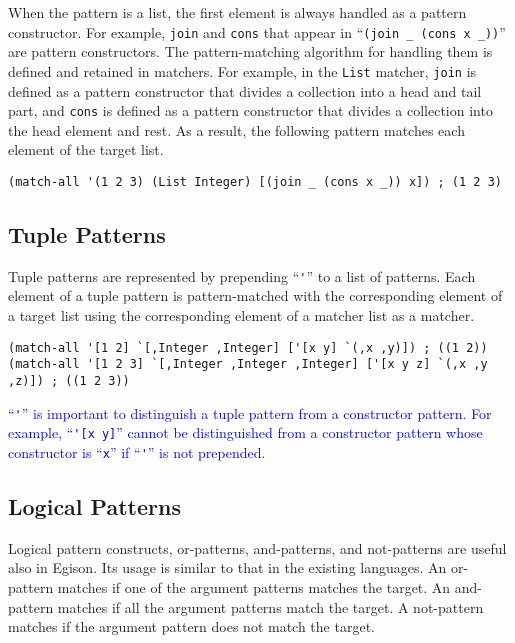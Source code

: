 \documentclass[acmlarge]{acmart}
\newcommand{\new}[1]{\textcolor{blue}{#1}}
\begin{document}
When the pattern is a list, the first element is always handled as a pattern constructor.
For example, \lstinline{join} and \lstinline{cons} that appear in ``\lstinline{(join _ (cons x _))}'' are pattern constructors.
The pattern-matching algorithm for handling them is defined and retained in matchers.
For example, in the \lstinline{List} matcher, \lstinline{join} is defined as a pattern constructor that divides a collection into a head and tail part, and \lstinline{cons} is defined as a pattern constructor that divides a collection into the head element and rest.
As a result, the following pattern matches each element of the target list.

\begin{lstlisting}[language=egison]
(match-all '(1 2 3) (List Integer) [(join _ (cons x _)) x]) ; (1 2 3)
\end{lstlisting}

\subsection{Tuple Patterns}

Tuple patterns are represented by prepending ``\lstinline{'}'' to a list of patterns.
Each element of a tuple pattern is pattern-matched with the corresponding element of a target list using the corresponding element of a matcher list as a matcher.

\begin{lstlisting}[language=egison]
(match-all '[1 2] `[,Integer ,Integer] ['[x y] `(,x ,y)]) ; ((1 2))
(match-all '[1 2 3] `[,Integer ,Integer ,Integer] ['[x y z] `(,x ,y ,z)]) ; ((1 2 3))
\end{lstlisting}

\new{
``\lstinline{'}'' is important to distinguish a tuple pattern from a constructor pattern.
For example, ``\lstinline{'[x y]}'' cannot be distinguished from a constructor pattern whose constructor is ``\lstinline{x}'' if ``\lstinline{'}'' is not prepended.
}%

\subsection{Logical Patterns}

Logical pattern constructs, or-patterns, and-patterns, and not-patterns are useful also in Egison.
Its usage is similar to that in the existing languages.
An or-pattern matches if one of the argument patterns matches the target.
An and-pattern matches if all the argument patterns match the target.
A not-pattern matches if the argument pattern does not match the target.
\end{document}
